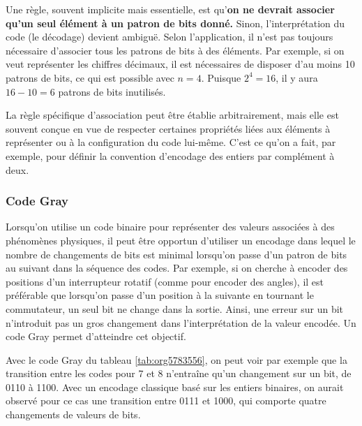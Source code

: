 \documentclass[11pt]{article}
\begin{document}
Une règle, souvent implicite mais essentielle, est qu'\textbf{on
ne devrait associer qu'un seul élément à un patron de bits donné.}
Sinon, l'interprétation du code (le décodage) devient ambiguë. Selon
l'application, il n'est pas toujours nécessaire d'associer tous les
patrons de bits à des éléments. Par exemple, si on veut représenter
les chiffres décimaux, il est nécessaires de disposer d'au moins 10
patrons de bits, ce qui est possible avec \(n=4\). Puisque \(2^4 =
16\), il y aura \(16 - 10 = 6\) patrons de bits inutilisés.

La règle spécifique d'association peut être établie arbitrairement,
mais elle est souvent conçue en vue de respecter certaines propriétés
liées aux éléments à représenter ou à la configuration du code
lui-même. C'est ce qu'on a fait, par exemple, pour définir la
convention d'encodage des entiers par complément à deux.

\subsubsection{Code Gray}
\label{sec:orgc941c2b}

Lorsqu'on utilise un code binaire pour représenter des valeurs
associées à des phénomènes physiques, il peut être opportun d’utiliser
un encodage dans lequel le nombre de changements de bits est minimal
lorsqu'on passe d'un patron de bits au suivant dans la séquence des
codes. Par exemple, si on cherche à encoder des positions d'un
interrupteur rotatif (comme pour encoder des angles), il est
préférable que lorsqu'on passe d'un position à la suivante en tournant
le commutateur, un seul bit ne change dans la sortie. Ainsi, une
erreur sur un bit n'introduit pas un gros changement dans
l'interprétation de la valeur encodée. Un code Gray permet d'atteindre
cet objectif.

Avec le code Gray du tableau \ref{tab:org5783556}, on peut voir par exemple que la
transition entre les codes pour 7 et 8 n’entraîne qu'un changement sur
un bit, de 0110 à 1100. Avec un encodage classique basé sur les
entiers binaires, on aurait observé pour ce cas une transition entre
0111 et 1000, qui comporte quatre changements de valeurs de bits.
\end{document}
